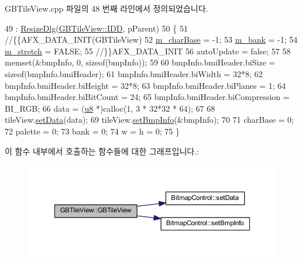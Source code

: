G\+B\+Tile\+View.\+cpp 파일의 48 번째 라인에서 정의되었습니다.


\begin{DoxyCode}
49   : \mbox{\hyperlink{class_resize_dlg_a87bab778e9312f274ebe750d4c3a67ee}{ResizeDlg}}(\mbox{\hyperlink{class_g_b_tile_view_a827f593cb0979d00c2e51aab7eecc619abaee2c28dc1c6835365ec6a66fccc5da}{GBTileView::IDD}}, pParent)
50 \{
51   \textcolor{comment}{//\{\{AFX\_DATA\_INIT(GBTileView)}
52   \mbox{\hyperlink{class_g_b_tile_view_a0ad19c822952ef98ced0a46d051cb87e}{m\_charBase}} = -1;
53   \mbox{\hyperlink{class_g_b_tile_view_a765264072397d9630d2f3ae8e58c414e}{m\_bank}} = -1;
54   \mbox{\hyperlink{class_g_b_tile_view_afaaee0263ecf447f8c628d0bbf1ff76f}{m\_stretch}} = FALSE;
55   \textcolor{comment}{//\}\}AFX\_DATA\_INIT}
56   autoUpdate = \textcolor{keyword}{false};
57   
58   memset(&bmpInfo, 0, \textcolor{keyword}{sizeof}(bmpInfo));
59 
60   bmpInfo.bmiHeader.biSize = \textcolor{keyword}{sizeof}(bmpInfo.bmiHeader);
61   bmpInfo.bmiHeader.biWidth = 32*8;
62   bmpInfo.bmiHeader.biHeight = 32*8;
63   bmpInfo.bmiHeader.biPlanes = 1;
64   bmpInfo.bmiHeader.biBitCount = 24;
65   bmpInfo.bmiHeader.biCompression = BI\_RGB;
66   data = (\mbox{\hyperlink{_system_8h_aed742c436da53c1080638ce6ef7d13de}{u8}} *)calloc(1, 3 * 32*32 * 64);
67 
68   tileView.\mbox{\hyperlink{class_bitmap_control_aa6206183896caf192a37709fa5d7b8d2}{setData}}(data);
69   tileView.\mbox{\hyperlink{class_bitmap_control_a301c52fc62de4368fccdcdc93cefad0b}{setBmpInfo}}(&bmpInfo);
70 
71   charBase = 0;
72   palette = 0;
73   bank = 0;
74   w = h = 0;
75 \}
\end{DoxyCode}
이 함수 내부에서 호출하는 함수들에 대한 그래프입니다.\+:
\nopagebreak
\begin{figure}[H]
\begin{center}
\leavevmode
\includegraphics[width=350pt]{class_g_b_tile_view_a16e732a5dfc802bca970d5cf667386df_cgraph}
\end{center}
\end{figure}
\mbox{\label{class_g_b_tile_view_a9ae36f3d54d161d2b98723e377569634}} 
